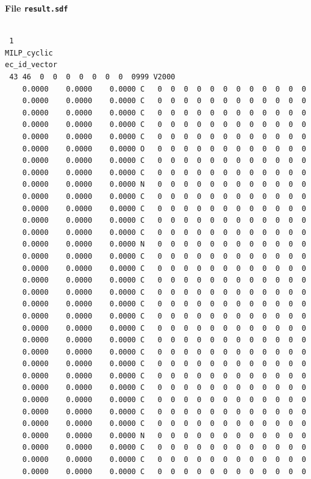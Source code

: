 \documentclass[11pt, titlepage, dvipdfmx, twoside]{jarticle}
\begin{document}
\begin{oframed}
{\bf File {\tt result.sdf}}\\\\
\begin{verbatim}
 1
MILP_cyclic
ec_id_vector
 43 46  0  0  0  0  0  0  0  0999 V2000 
    0.0000    0.0000    0.0000 C   0  0  0  0  0  0  0  0  0  0  0  0
    0.0000    0.0000    0.0000 C   0  0  0  0  0  0  0  0  0  0  0  0
    0.0000    0.0000    0.0000 C   0  0  0  0  0  0  0  0  0  0  0  0
    0.0000    0.0000    0.0000 C   0  0  0  0  0  0  0  0  0  0  0  0
    0.0000    0.0000    0.0000 C   0  0  0  0  0  0  0  0  0  0  0  0
    0.0000    0.0000    0.0000 O   0  0  0  0  0  0  0  0  0  0  0  0
    0.0000    0.0000    0.0000 C   0  0  0  0  0  0  0  0  0  0  0  0
    0.0000    0.0000    0.0000 C   0  0  0  0  0  0  0  0  0  0  0  0
    0.0000    0.0000    0.0000 N   0  0  0  0  0  0  0  0  0  0  0  0
    0.0000    0.0000    0.0000 C   0  0  0  0  0  0  0  0  0  0  0  0
    0.0000    0.0000    0.0000 C   0  0  0  0  0  0  0  0  0  0  0  0
    0.0000    0.0000    0.0000 C   0  0  0  0  0  0  0  0  0  0  0  0
    0.0000    0.0000    0.0000 C   0  0  0  0  0  0  0  0  0  0  0  0
    0.0000    0.0000    0.0000 N   0  0  0  0  0  0  0  0  0  0  0  0
    0.0000    0.0000    0.0000 C   0  0  0  0  0  0  0  0  0  0  0  0
    0.0000    0.0000    0.0000 C   0  0  0  0  0  0  0  0  0  0  0  0
    0.0000    0.0000    0.0000 C   0  0  0  0  0  0  0  0  0  0  0  0
    0.0000    0.0000    0.0000 C   0  0  0  0  0  0  0  0  0  0  0  0
    0.0000    0.0000    0.0000 C   0  0  0  0  0  0  0  0  0  0  0  0
    0.0000    0.0000    0.0000 C   0  0  0  0  0  0  0  0  0  0  0  0
    0.0000    0.0000    0.0000 C   0  0  0  0  0  0  0  0  0  0  0  0
    0.0000    0.0000    0.0000 C   0  0  0  0  0  0  0  0  0  0  0  0
    0.0000    0.0000    0.0000 C   0  0  0  0  0  0  0  0  0  0  0  0
    0.0000    0.0000    0.0000 C   0  0  0  0  0  0  0  0  0  0  0  0
    0.0000    0.0000    0.0000 C   0  0  0  0  0  0  0  0  0  0  0  0
    0.0000    0.0000    0.0000 C   0  0  0  0  0  0  0  0  0  0  0  0
    0.0000    0.0000    0.0000 C   0  0  0  0  0  0  0  0  0  0  0  0
    0.0000    0.0000    0.0000 C   0  0  0  0  0  0  0  0  0  0  0  0
    0.0000    0.0000    0.0000 C   0  0  0  0  0  0  0  0  0  0  0  0
    0.0000    0.0000    0.0000 N   0  0  0  0  0  0  0  0  0  0  0  0
    0.0000    0.0000    0.0000 C   0  0  0  0  0  0  0  0  0  0  0  0
    0.0000    0.0000    0.0000 C   0  0  0  0  0  0  0  0  0  0  0  0
    0.0000    0.0000    0.0000 C   0  0  0  0  0  0  0  0  0  0  0  0

\end{verbatim}
\end{oframed}
\end{document}
